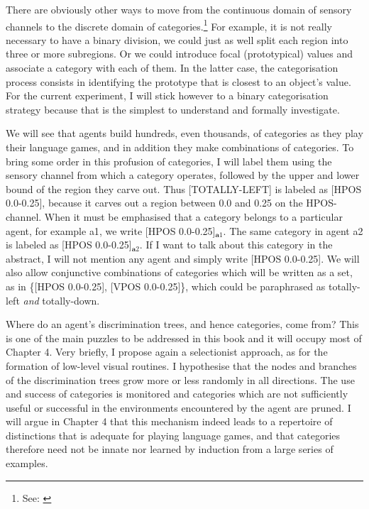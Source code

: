 There are obviously other ways to 
move from the continuous domain of sensory channels to 
the discrete domain of categories.\footnote{
See: \cite{Taylor:1989}}
For example, it is not really necessary 
to have a binary division, we could just as well split 
each region into three or more subregions. Or we could introduce
focal (prototypical) values and associate
a category with each of them. In the latter case, 
the categorisation process consists 
in identifying the prototype that is closest to 
an object's value. For the current experiment, I will stick however
to a binary categorisation strategy because that is
the simplest to understand and formally investigate. 

We will see that agents build hundreds,
even thousands, of categories as they play their
language games, and in addition they make combinations of 
categories. To bring some order in this profusion of 
categories, I will label them using the 
sensory channel from which a category operates, 
followed by the upper and lower bound of the region they 
carve out. Thus [TOTALLY-LEFT]
is labeled as [HPOS 0.0-0.25], because it carves 
out a region between 0.0 and 0.25 on the HPOS-channel. 
When it must be emphasised that 
a category belongs to a particular agent, for example {\bfshape a1}, we
write [HPOS 0.0-0.25]$_{\mathbf a1}$. The same category in agent {\bfshape a2}
is labeled as [HPOS 0.0-0.25]$_{\mathbf a2}$. If I want to talk about 
this category in the abstract, I will not mention any 
agent and simply write [HPOS 0.0-0.25]. We will also 
allow conjunctive combinations of categories which will be
written as a set, as in \{[HPOS 0.0-0.25], [VPOS 0.0-0.25]\}, 
which could be paraphrased as totally-left {\itshape and}
totally-down.  

Where do an agent's discrimination trees, and hence
categories, come from? This is one of the main 
puzzles to be addressed in this book and it will 
occupy most of Chapter 4. Very briefly, 
I propose again a selectionist approach, as for
the formation of low-level visual routines. I hypothesise
that the nodes and branches of the discrimination trees
grow more or less randomly in all directions. The use and
success of categories is monitored and categories which 
are not sufficiently useful or successful in the environments
encountered by the agent are pruned. I will argue in Chapter 4
that this mechanism indeed leads to 
a repertoire of distinctions that is adequate for 
playing language games, and that 
categories therefore need not be innate nor learned by 
induction from a large series of examples. 

